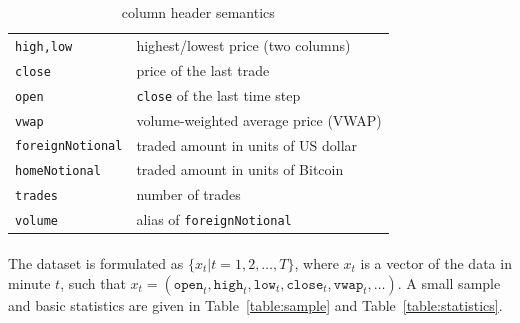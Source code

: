 \documentclass[12pt, letterpaper]{article}
\begin{document}
\begin{table}
    \caption{column header semantics}%
    \label{table:column-header}
    \centering
    \begin{tabular}{ll}
        \toprule
        \texttt{high,low} & highest/lowest price (two columns) \\
        \texttt{close} & price of the last trade \\
        \texttt{open} & \texttt{close} of the last time step \\
        \texttt{vwap} & volume-weighted average price (VWAP) \\
        \texttt{foreignNotional} & traded amount in units of US dollar \\
        \texttt{homeNotional} & traded amount in units of Bitcoin \\
        \texttt{trades} & number of trades \\
        \texttt{volume} & alias of \texttt{foreignNotional} \\
        \bottomrule
    \end{tabular}
\end{table}

\paragraph{}
The dataset is formulated as \(\{x_t|t=1,2,\dots,T\}\), where \(x_t\) is a vector of the data in minute \(t\), such that \(x_t=(\mathtt{open}_t,\mathtt{high}_t,\mathtt{low}_t,\mathtt{close}_t,\mathtt{vwap}_t,\dots)\). A small sample and basic statistics are given in Table~\ref{table:sample} and Table~\ref{table:statistics}.
\end{document}
